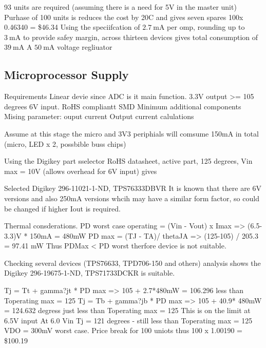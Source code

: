 93 units are required (assuming there is a need for 5V in the master unit)
Purhase of 100 units is reduces the cost by 20C and gives seven spares
100x 0.46340 = \$46.34
Using the speciifcation of $\SI{2.7}{\milli\ampere}$ per omp, rounding up to $\SI{3}{\milli\ampere}$ to provide safey margin, across thirteen devices gives total consumption of $\SI{39}{\milli\ampere}$ 
A $\SI{50}{\milli\ampere}$ voltage regliuator

\subsection{Microprocessor Supply}
Requirements
Linear devie since ADC is it main function.
3.3V output
>= 105 degrees
6V input.
RoHS compliantt
SMD
Minimum additional components
Mising parameter: ouput current
Output current calulations

Assume at this stage the micro and 3V3 periphials will comsume 150mA in total (micro, LED x 2, possbible buss chips)

Using the Digikey part sselector 
RoHS datasheet, active part, 125 degrees, Vin max = 10V (allows overhead for 6V input) gives 

Selected Digikey 296-11021-1-ND, TPS76333DBVR
It is known that there are 6V versions and also 250mA versions whcih may have a similar form factor, so could be changed if higher Iout is required.

Thermal consderations.
PD worst case operating = (Vin - Vout) x Imax => (6.5-3.3)V * 150mA = 480mW
PD max = (TJ - TA)/ thetaJA => (125-105) / 205.3 = 97.41 mW
Thus PDMax < PD worst therfore device is not suitable.

Checking several devices (TPS76633, TPD706-150 and others) analysis shows the Digikey 296-19675-1-ND, TPS71733DCKR is suitable.

Tj = Tt + gamma?jt * PD max => 105 + 2.7*480mW = 106.296 less than Toperating max = 125 
Tj = Tb + gamma?jb * PD max => 105 + 40.9* 480mW = 124.632 degress just less than Toperating max = 125 
This is on the limit at 6.5V input 
At 6.0 Vin Tj = 121 degrees - still less than Toperating max = 125 
VDO = 300mV worst case.
Price break for 100 uniots thus 100 x 1.00190 =  \$100.19 